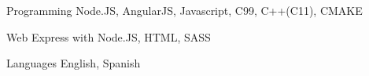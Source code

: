 

\begin{cvskills}

  \cvskill
    {Programming} %
    {Node.JS, AngularJS, Javascript, C99, C++(C11), CMAKE} %

  \cvskill
    {Web} %
    {Express with Node.JS, HTML, SASS} %

  \cvskill
    {Languages} %
    {English, Spanish} %

\end{cvskills}
